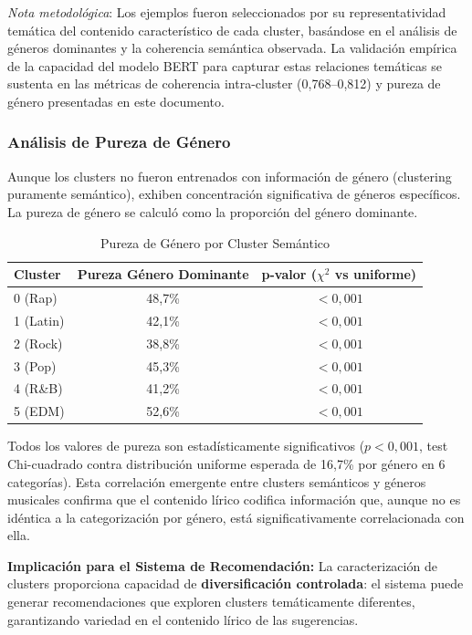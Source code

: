 \textit{Nota metodológica}: Los ejemplos fueron seleccionados por su representatividad temática del contenido característico de cada cluster, basándose en el análisis de géneros dominantes y la coherencia semántica observada. La validación empírica de la capacidad del modelo BERT para capturar estas relaciones temáticas se sustenta en las métricas de coherencia intra-cluster (0,768--0,812) y pureza de género presentadas en este documento.

\subsubsection{Análisis de Pureza de Género}

Aunque los clusters no fueron entrenados con información de género (clustering puramente semántico), exhiben concentración significativa de géneros específicos. La pureza de género se calculó como la proporción del género dominante.

\begin{table}[htbp]
\centering
\caption{Pureza de Género por Cluster Semántico}
\label{tab:pureza-genero}
\begin{tabular}{lcc}
\toprule
\textbf{Cluster} & \textbf{Pureza Género Dominante} & \textbf{p-valor ($\chi^2$ vs uniforme)} \\
\midrule
0 (Rap) & 48,7\% & $< 0{,}001$ \\
1 (Latin) & 42,1\% & $< 0{,}001$ \\
2 (Rock) & 38,8\% & $< 0{,}001$ \\
3 (Pop) & 45,3\% & $< 0{,}001$ \\
4 (R\&B) & 41,2\% & $< 0{,}001$ \\
5 (EDM) & 52,6\% & $< 0{,}001$ \\
\bottomrule
\end{tabular}
\end{table}

Todos los valores de pureza son estadísticamente significativos ($p < 0{,}001$, test Chi-cuadrado contra distribución uniforme esperada de 16,7\% por género en 6 categorías). Esta correlación emergente entre clusters semánticos y géneros musicales confirma que el contenido lírico codifica información que, aunque no es idéntica a la categorización por género, está significativamente correlacionada con ella.

\textbf{Implicación para el Sistema de Recomendación:} La caracterización de clusters proporciona capacidad de \textbf{diversificación controlada}: el sistema puede generar recomendaciones que exploren clusters temáticamente diferentes, garantizando variedad en el contenido lírico de las sugerencias.

